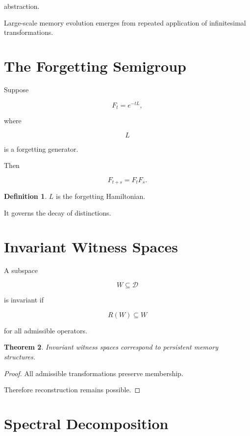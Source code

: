 \documentclass[12pt,oneside]{book}
\theoremstyle{plain} \newtheorem{theorem}{Theorem}[chapter] \newtheorem{lemma}[theorem]{Lemma} \newtheorem{proposition}[theorem]{Proposition} \newtheorem{corollary}[theorem]{Corollary}
\theoremstyle{definition} \newtheorem{definition}[theorem]{Definition} \newtheorem{axiom}[theorem]{Axiom} \newtheorem{construction}[theorem]{Construction}
\theoremstyle{remark} \newtheorem{remark}[theorem]{Remark} \newtheorem{example}[theorem]{Example}
\begin{document}
abstraction.

Large-scale memory evolution emerges from repeated application of infinitesimal transformations.

\section{The Forgetting Semigroup}

Suppose

\[
F_t
=
e^{-tL},
\]

where

\[
L
\]

is a forgetting generator.

Then

\[
F_{t+s}
=
F_tF_s.
\]

\begin{definition}

$L$ is the forgetting Hamiltonian.

\end{definition}

It governs the decay of distinctions.

\section{Invariant Witness Spaces}

A subspace

\[
W
\subseteq
\mathcal D
\]

is invariant if

\[
R(W)
\subseteq
W
\]

for all admissible operators.

\begin{theorem}

Invariant witness spaces correspond to persistent memory structures.

\end{theorem}

\begin{proof}

All admissible transformations preserve membership.

Therefore reconstruction remains possible.

\end{proof}

\section{Spectral Decomposition}
\end{document}
